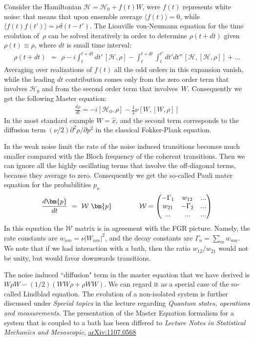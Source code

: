 \documentclass[onecolumn,fleqn, 11pt]{revtex4}
\newcommand{\amatrix}[1]{\begin{matrix} #1 \end{matrix}}
\newcommand{\beq}{\begin{eqnarray}}
\newcommand{\eeq}{\end{eqnarray}}
\begin{document}
Consider the Hamiltonian ${\mathcal{H}=\mathcal{H}_0+f(t)W}$, 
were  $f(t)$ represents white noise: that means that upon 
ensemble average ${\langle f(t)\rangle=0}$, 
while ${\langle f(t)f(t') \rangle = \nu\delta(t-t')}$. 
The Liouville von-Neumann equation for the time evolution 
of~$\rho$ can be solved iteratively in order 
to determine $\rho(t+dt)$ given $\rho(t)\equiv\rho$, where $dt$ 
is small time interval:
\beq
\rho(t+dt) \ \ = \ \ \rho -i\int_t^{t+dt} dt' \, [\mathcal{H}, \rho] 
-\int_t^{t+dt} \int_t^{t'}  dt'dt''  \, [\mathcal{H}, [\mathcal{H}, \rho]] + ... 
\eeq
Averaging over realizations of $f(t)$ all the odd orders in this expansion 
vanish, while the leading $dt$ contribution comes only from the 
zero order term that involves $\mathcal{H}_0$ 
and from the second order term that involves~$W$.
Consequently we get the following Master equation:
\beq 
\frac{d\rho}{dt} = -i[\mathcal{H}_0,\rho] - \frac{1}{2}\nu[W,[W,\rho]]
\eeq
In the most standard example $W=\hat{x}$, 
and the second term corresponds to the 
diffusion term ${(\nu/2)\partial^2\rho/\partial p^2}$ 
in the classical Fokker-Plank equation.


In the weak noise limit the rate of the noise induced 
transitions becomes much smaller compared with the Bloch 
frequency of the coherent transitions. 
Then we can ignore all the highly oscillating terms 
that involve the off-diagonal terms, because they average to zero. 
Consequently we get the so-called Pauli mater equation 
for the probabilities $p_n$  
\beq 
\frac{d\bm{p}}{dt} \ = \ \mathcal{W} \ \bm{p}
\ \ \ \ \ \ \ \ \ \ \ \ 
\mathcal{W} = \left( 
\amatrix{
-\Gamma_1 & w_{12} & ... \cr
w_{21} & -\Gamma_2 & ... \cr
... & ... & ...
} 
\right)
\eeq
In this equation the $\mathcal{W}$ matrix is in agreement 
with the FGR picture. Namely, the rate constants 
are $w_{nm} = \nu |W_{nm}|^2$,  
and the decay constants are $\Gamma_n=\sum_m w_{nm}$. 
We note that if we had interaction with a bath, 
then the ratio $w_{12}/w_{21}$ would not be unity, 
but would favor downwards transitions. 


The noise induced ``diffusion" term in the master equation 
that we have derived is ${W\rho W-(1/2)(W W \rho + \rho W W)}$. 
We can regard it as a special case of the so-called Lindblad equation.
The evolution of a non-isolated system is further 
discussed under {\em Special topics} in the lecture 
regarding {\em Quantum states, operations and measurements}. 
The presentation of the Master Equation formalism for 
a system that is coupled to a bath has been differed to    
{\em Lecture Notes in Statistical Mechanics and Mesoscopic}, 
\href{http://arxiv.org/abs/1107.0568}{arXiv:1107.0568}
\end{document}
